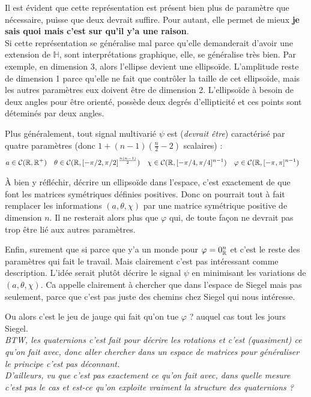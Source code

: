 Il est évident que cette représentation est présent bien plus de paramètre que nécessaire, puisse que deux devrait suffire. Pour autant, elle permet de mieux \textbf{je sais quoi mais c'est sur qu'il y'a une raison}.
\\
Si cette représentation se généralise mal parce qu'elle demanderait d'avoir une extension de $\mathbb{H}$, sont interprétations graphique, elle, se généralise très bien. Par exemple, en dimension 3, alors l'ellipse devient une ellipsoïde. L'amplitude reste de dimension 1 parce qu'elle ne fait que contrôler la taille de cet ellipsoïde, mais les autres paramètres eux doivent être de dimension 2. L'ellipsoïde à besoin de deux angles pour être orienté, possède deux degrés d'ellipticité et ces points sont déteminés par deux angles.
\\

\begin{proposition}\label{prop:gene_param_signal_v1}
Plus généralement, tout signal multivarié $\psi$ est (\textit{devrait être}) caractérisé par quatre paramètres (donc $1+(n-1)(\frac{n}{2}-2)$ scalaires) :
\begin{align*}
	a&\in\mathcal{C}(\mathbb{R},\mathbb{R}^+)  &  \theta&\in\mathcal{C}(\mathbb{R}, [-\pi/2,\pi/2]^{\frac{n(n-1)}{2}})  &  \chi&\in\mathcal{C}(\mathbb{R}, [-\pi/4,\pi/4]^{n-1})  &  \varphi&\in\mathcal{C}(\mathbb{R}, [-\pi,\pi]^{n-1})
\end{align*}	
\end{proposition}

\`A bien y réfléchir, décrire un ellipsoïde dans l'espace, c'est exactement de que font les matrices symétriques définies positives. Donc on pourrait tout à fait remplacer les informations $(a,\theta,\chi)$ par une matrice symétrique positive de dimension $n$. Il ne resterait alors plus que $\varphi$ qui, de toute façon ne devrait pas trop être lié aux autres paramètres.

Enfin, surement que si parce que y'a un monde pour $\varphi=0_{\mathbb{R}}^n$ et c'est le reste des paramètres qui fait le travail. Mais clairement c'est pas intéressant comme description. L'idée serait plutôt décrire le signal $\psi$ en minimisant les variations de $(a,\theta,\chi)$.
Ca appelle clairement à chercher que dans l'espace de Siegel mais pas seulement, parce que c'est pas juste des chemins chez Siegel qui nous intéresse.

Ou alors c'est le jeu de jauge qui fait qu'on tue $\varphi$ ? auquel cas tout les jours Siegel.
\\

\textit{BTW, les quaternions c'est fait pour décrire les rotations et c'est (quasiment) ce qu'on fait avec, donc aller chercher dans un espace de matrices pour généraliser le principe c'est pas déconnant.}
\\
\textit{D'ailleurs, vu que c'est pas exactement ce qu'on fait avec, dans quelle mesure c'est pas le cas et est-ce qu'on exploite vraiment la structure des quaternions ?}
\\ 

